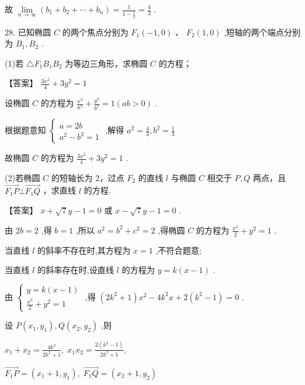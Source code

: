 \documentclass[10pt]{article}
\begin{document}
故 \(\mathop{\lim }\limits_{{n \rightarrow  \infty }}\left( {{b}_{1} + {b}_{2} + \cdots  + {b}_{n}}\right)  = \frac{1}{1 - \frac{1}{4}} = \frac{4}{3}\) .

28. 已知椭圆 \(C\) 的两个焦点分别为 \({F}_{1}\left( {-1,0}\right) \text{ 、 }{F}_{2}\left( {1,0}\right)\) ,短轴的两个端点分别为 \({B}_{1},{B}_{2}\) .

(1)若 \(\bigtriangleup {F}_{1}{B}_{1}{B}_{2}\) 为等边三角形，求椭圆 \(C\) 的方程；

【答案】 \(\frac{3{x}^{2}}{4} + 3{y}^{2} = 1\)

设椭圆 \(C\) 的方程为 \(\frac{{x}^{2}}{{a}^{2}} + \frac{{y}^{2}}{{b}^{2}} = 1\left( {{ab} > 0}\right)\) .

根据题意知 \(\left\{  \begin{array}{l} a = {2b} \\  {a}^{2} - {b}^{2} = 1 \end{array}\right.\) ,解得 \({a}^{2} = \frac{4}{3},{b}^{2} = \frac{1}{3}\)

故椭圆 \(C\) 的方程为 \(\frac{3{x}^{2}}{4} + 3{y}^{2} = 1\) .

(2)若椭圆 \(C\) 的短轴长为 2，过点 \({F}_{2}\) 的直线 \(l\) 与椭圆 \(C\) 相交于 \(P,Q\) 两点，且 \(\overrightarrow{{F}_{1}P} \bot  \overrightarrow{{F}_{1}Q}\) ，求直线 \(l\) 的方程.

【答案】 \(x + \sqrt{7}y - 1 = 0\) 或 \(x - \sqrt{7}y - 1 = 0\) .

由 \({2b} = 2\) ,得 \(b = 1\) ,所以 \({a}^{2} = {b}^{2} + {c}^{2} = 2\) ,得椭圆 \(C\) 的方程为 \(\frac{{x}^{2}}{2} + {y}^{2} = 1\) .

当直线 \(l\) 的斜率不存在时,其方程为 \(x = 1\) ,不符合题意;

当直线 \(l\) 的斜率存在时,设直线 \(l\) 的方程为 \(y = k\left( {x - 1}\right)\) .

由 \(\left\{  \begin{array}{l} y = k\left( {x - 1}\right) \\  \frac{{x}^{2}}{2} + {y}^{2} = 1 \end{array}\right.\) ,得 \(\left( {2{k}^{2} + 1}\right) {x}^{2} - 4{k}^{2}x + 2\left( {{k}^{2} - 1}\right)  = 0\) .

设 \(P\left( {{x}_{1},{y}_{1}}\right) ,Q\left( {{x}_{2},{y}_{2}}\right)\) ,则

\({x}_{1} + {x}_{2} = \frac{4{k}^{2}}{2{k}^{2} + 1},\;{x}_{1}{x}_{2} = \frac{2\left( {{k}^{2} - 1}\right) }{2{k}^{2} + 1},\)

\(\overrightarrow{{F}_{1}P} = \left( {{x}_{1} + 1,{y}_{1}}\right) ,\;\overrightarrow{{F}_{1}Q} = \left( {{x}_{2} + 1,{y}_{2}}\right)\)
\end{document}
